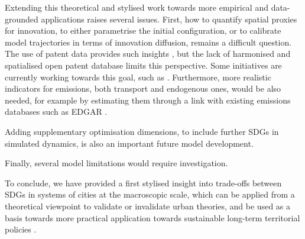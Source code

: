 \documentclass[final,5p,times,twocolumn,authoryear]{elsarticle}
\begin{document}
Extending this theoretical and stylised work towards more empirical and data-grounded applications raises several issues. First, how to quantify spatial proxies for innovation, to either parametrise the initial configuration, or to calibrate model trajectories in terms of innovation diffusion, remains a difficult question. The use of patent data provides such insights \cite{griliches200713}, but the lack of harmonised and spatialised open patent database limits this perspective. Some initiatives are currently working towards this goal, such as \cite{bergeaud2021patentcity}. Furthermore, more realistic indicators for emissions, both transport and endogenous ones, would be also needed, for example by estimating them through a link with existing emissions databases such as EDGAR \cite{olivier1994emission}.

Adding supplementary optimisation dimensions, to include further SDGs in simulated dynamics, is also an important future model development.

Finally, several model limitations would require investigation.

To conclude, we have provided a first stylised insight into trade-offs between SDGs in systems of cities at the macroscopic scale, which can be applied from a theoretical viewpoint to validate or invalidate urban theories, and be used as a basis towards more practical application towards sustainable long-term territorial policies \citep{rozenblat2018conclusion}.






 





\end{document}
